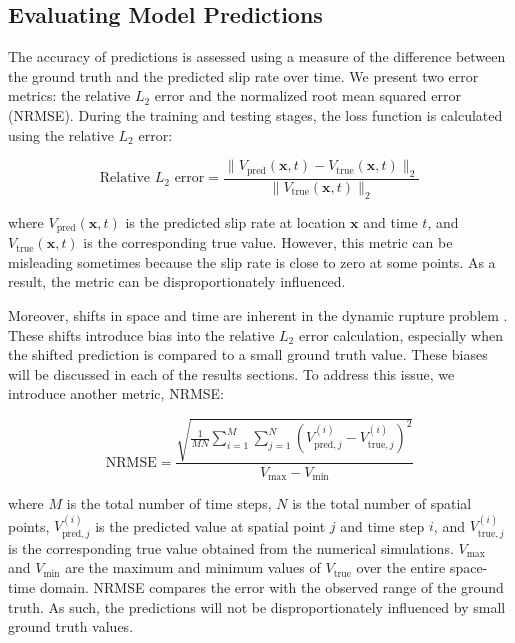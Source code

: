 \documentclass[draft]{agujournal2019}
\providecommand{\DIFaddend}{} %
\DeclareRobustCommand{\DIFaddend}{\DIFOaddend \let\includegraphics\DIFOincludegraphics} %
\begin{document}
\DIFaddend \subsection{Evaluating Model Predictions}
\label{sec:eval}

The accuracy of predictions is assessed using a measure of the difference between the ground truth and the predicted slip rate over time. We present two error metrics: the relative \(L_2\) error and the normalized root mean squared error (NRMSE). During the training and testing stages, the loss function is calculated using the relative \(L_2\) error:

\begin{equation}
\label{eqn:rel_l2}
\text{Relative } L_2 \text{ error} = \frac{\| V_{\text{pred}}(\mathbf{x}, t) - V_{\text{true}}(\mathbf{x}, t) \|_2}{\| V_{\text{true}}(\mathbf{x}, t) \|_2}
\end{equation}

where \(V_{\text{pred}}(\mathbf{x}, t)\) is the predicted slip rate at location \(\mathbf{x}\) and time \(t\), and \(V_{\text{true}}(\mathbf{x}, t)\) is the corresponding true value. However, this metric can be misleading sometimes because the slip rate is close to zero at some points. As a result, the metric can be disproportionately influenced. 

Moreover, shifts in space and time are inherent in the dynamic rupture problem \cite{barall2015metrics}. These shifts introduce bias into the relative \(L_2\) error calculation, especially when the shifted prediction is compared to a small ground truth value. These biases will be discussed in each of the results sections. To address this issue, we introduce another metric, NRMSE:

\begin{equation}
\label{eqn:NRMSE}
\text{NRMSE} = \frac{\sqrt{\frac{1}{M N} \sum_{i=1}^{M} \sum_{j=1}^{N} \left( V_{\text{pred}, j}^{(i)} - V_{\text{true}, j}^{(i)} \right)^2 }}{V_{\max} - V_{\min}}
\end{equation}

where \(M\) is the total number of time steps, \(N\) is the total number of spatial points, \(V_{\text{pred}, j}^{(i)}\) is the predicted value at spatial point \(j\) and time step \(i\), and \(V_{\text{true}, j}^{(i)}\) is the corresponding true value obtained from the numerical simulations. \(V_{\max}\) and \(V_{\min}\) are the maximum and minimum values of \(V_{\text{true}}\) over the entire space-time domain. NRMSE compares the error with the observed range of the ground truth. As such, the predictions will not be disproportionately influenced by small ground truth values.
\end{document}
